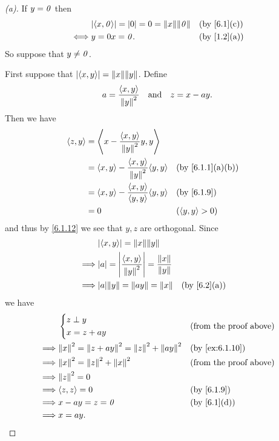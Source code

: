 \begin{proof}[(a)]
  If \(y = \mathit{0}\) then
  \begin{align*}
         & \abs{\inn{x, \zv}} = \abs{0} = 0 = \norm{x} \norm{\zv} &  & \text{(by \cref{6.1}(c))} \\
    \iff & y = 0x = \zv.                                          &  & \text{(by \cref{1.2}(a))}
  \end{align*}
  So suppose that \(y \neq \mathit{0}\).

  First suppose that \(\abs{\inn{x, y}} = \norm{x} \norm{y}\).
  Define
  \[
    a = \frac{\left\langle x, y\right\rangle}{\left\lVert y\right\rVert^2} \quad \text{and} \quad z = x - ay.
  \]
  Then we have
  \begin{align*}
    \inn{z, y} & = \inn{x - \frac{\inn{x, y}}{\norm{y}^2} y, y}                                              \\
               & = \inn{x, y} - \frac{\inn{x, y}}{\norm{y}^2} \inn{y, y} &  & \text{(by \cref{6.1.1}(a)(b))} \\
               & = \inn{x, y} - \frac{\inn{x, y}}{\inn{y, y}} \inn{y, y} &  & \text{(by \cref{6.1.9})}       \\
               & = 0                                                     &  & (\inn{y, y} > 0)
  \end{align*}
  and thus by \cref{6.1.12} we see that \(y, z\) are orthogonal.
  Since
  \begin{align*}
             & \abs{\inn{x, y}} = \norm{x} \norm{y}                                                                     \\
    \implies & \abs{a} = \abs{\frac{\inn{x, y}}{\norm{y}^2}} = \frac{\norm{x}}{\norm{y}}                                \\
    \implies & \abs{a} \norm{y} = \norm{ay} = \norm{x}                                   &  & \text{(by \cref{6.2}(a))} \\
  \end{align*}
  we have
  \begin{align*}
             & \begin{dcases}
                 z \perp y \\
                 x = z + ay
               \end{dcases}                                          &  & \text{(from the proof above)}   \\
    \implies & \norm{x}^2 = \norm{z + ay}^2 = \norm{z}^2 + \norm{ay}^2 &  & \text{(by \cref{ex:6.1.10})}  \\
    \implies & \norm{x}^2 = \norm{z}^2 + \norm{x}^2                    &  & \text{(from the proof above)} \\
    \implies & \norm{z}^2 = 0                                                                             \\
    \implies & \inn{z, z} = 0                                          &  & \text{(by \cref{6.1.9})}      \\
    \implies & x - ay = z = \zv                                        &  & \text{(by \cref{6.1}(d))}     \\
    \implies & x = ay.
  \end{align*}


\end{proof}
